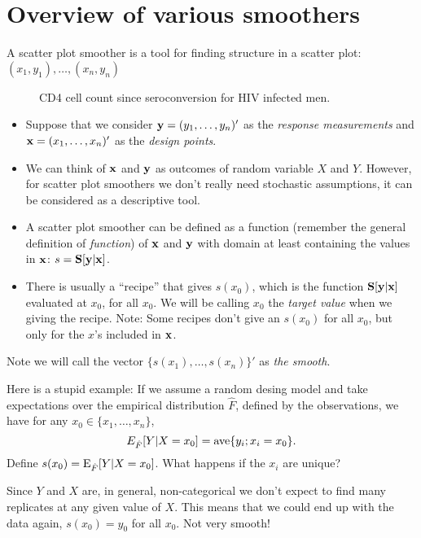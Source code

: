 \chapter{Overview of various smoothers}
A scatter plot smoother is a tool for finding structure in a scatter
plot: $(x_1,y_1),\dots,(x_n,y_n)$


\begin{figure}[htp]
\caption{\label{f2.1} CD4 cell count since seroconversion for HIV
  infected men.} 
\centerline{}
\end{figure}

\begin{itemize}
\item Suppose that we consider ${\mathbf y} = (y_1,\dots,y_n)'$ as the {\it response
measurements} and ${\mathbf x} = (x_1,\dots,x_n)'$ as the {\it design points}.

\item We can think of ${\mathbf x}$ and ${\mathbf y}$ as outcomes of random variable $X$
and $Y$. However, for scatter plot smoothers we don't
really need stochastic assumptions, it can be considered as a
descriptive tool.

\item A scatter plot smoother can be defined as a function (remember
  the general definition of {\it function}) of ${\mathbf x}$ and
${\mathbf y}$ with domain at least containing the values in ${\mathbf x}$: $s =
{\mathbf S}[{\mathbf y} | {\mathbf x}]$. 
 
\item There is usually a ``recipe'' that gives $s(x_0)$, which is the function
${\mathbf S}[{\mathbf y} | {\mathbf x}]$ evaluated at $x_0$,  for all $x_0$. We will be
calling $x_0$ the {\it target value} when we giving the recipe. Note:
Some recipes don't give an $s(x_0)$ for all $x_0$, but only for the
$x$'s included in ${\mathbf x}$. 

\end{itemize}

Note we will call the vector $\{s(x_1),\dots,s(x_n)\}'$ as {\it the smooth}.

Here is a stupid example: If we assume a random desing model and take
expectations over the empirical distribution $\hat{F}$, defined by the
observations, we have for any $x_0 \in \{x_1,\dots,x_n\}$, 
\[
E_{\hat{F}}[Y|X=x_0] = \mbox{ave} \{ y_i; x_i = x_0\}. 
\]
Define $s(x_0)=\mbox{E}_{\hat{F}}[Y|X=x_0]$. What happens if the $x_i$ are
unique? 

Since $Y$ and $X$ are, in general,  non-categorical we don't expect to
find many replicates at any given value of $X$. This means that we
could end up with the data again, $s(x_0)=y_0$ for all $x_0$. Not very
smooth!

